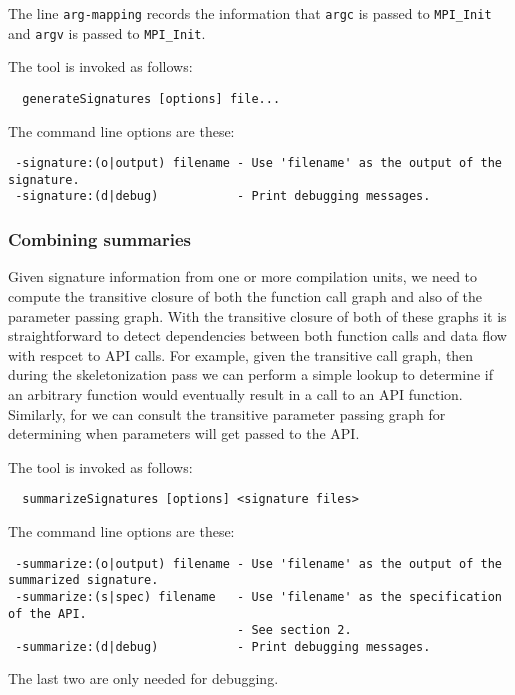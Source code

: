 The line \verb|arg-mapping| records the information that \verb|argc| is passed
to \verb|MPI_Init| and \verb|argv| is passed to \verb|MPI_Init|.

The tool is invoked as follows:
\begin{verbatim}
  generateSignatures [options] file...
\end{verbatim}

The command line options are these:

\begin{verbatim}
 -signature:(o|output) filename - Use 'filename' as the output of the signature.
 -signature:(d|debug)           - Print debugging messages.
\end{verbatim}


\subsubsection{Combining summaries}

Given signature information from one or more compilation units, we need to
compute the transitive closure of both the function call graph and also of the
parameter passing graph. With the transitive closure of both of these graphs it
is straightforward to detect dependencies between both function calls and data
flow with respcet to API calls. For example, given the transitive call graph,
then during the skeletonization pass we can perform a simple lookup to
determine if an arbitrary function would eventually result in a call to an API
function. Similarly, for we can consult the transitive parameter passing graph
for determining when parameters will get passed to the API.

The tool is invoked as follows:
\begin{verbatim}
  summarizeSignatures [options] <signature files>
\end{verbatim}

The command line options are these:

\begin{verbatim}
 -summarize:(o|output) filename - Use 'filename' as the output of the summarized signature.
 -summarize:(s|spec) filename   - Use 'filename' as the specification of the API.
                                - See section 2.
 -summarize:(d|debug)           - Print debugging messages.
\end{verbatim}

The last two are only needed for debugging.


